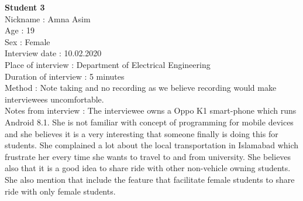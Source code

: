 \large{\textbf{Student 3}} 
\\ Nickname : Amna Asim 
\\ Age : 19 
\\ Sex : Female 
\\ Interview date : 10.02.2020 
\\ Place of interview : Department of Electrical Engineering
\\ Duration of interview : 5 minutes 
\\ Method : Note taking and no recording as we believe recording would make interviewees uncomfortable.
\\ Notes from interview : The interviewee owns a Oppo K1 smart-phone which runs Android 8.1. She is not familiar with concept of programming for mobile devices and she believes it is a very interesting that someone finally is doing this for students. She complained a lot about the local transportation in Islamabad which frustrate her every time she wants to travel to and from university. She believes also that it is a good idea to share ride with other non-vehicle owning students. She also mention that include the feature that facilitate female students to share ride with only female students.
 
